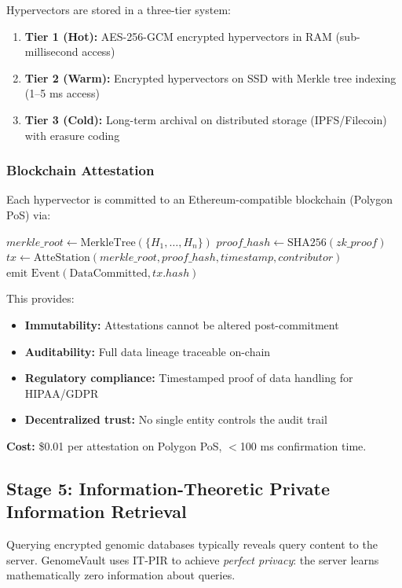 \documentclass[12pt,a4paper]{article}
\begin{document}
Hypervectors are stored in a three-tier system:
\begin{enumerate}
\item \textbf{Tier 1 (Hot):} AES-256-GCM encrypted hypervectors in RAM (sub-millisecond access)
\item \textbf{Tier 2 (Warm):} Encrypted hypervectors on SSD with Merkle tree indexing (1--5 ms access)
\item \textbf{Tier 3 (Cold):} Long-term archival on distributed storage (IPFS/Filecoin) with erasure coding
\end{enumerate}

\subsubsection{Blockchain Attestation}

Each hypervector is committed to an Ethereum-compatible blockchain (Polygon PoS) via:

\begin{algorithmic}
\STATE $merkle\_root \leftarrow \text{MerkleTree}(\{H_1, \ldots, H_n\})$
\STATE $proof\_hash \leftarrow \text{SHA256}(zk\_proof)$
\STATE $tx \leftarrow \text{AtteStation}(merkle\_root, proof\_hash, timestamp, contributor)$
\STATE $\text{emit Event}(\text{DataCommitted}, tx.hash)$
\end{algorithmic}

This provides:
\begin{itemize}
\item \textbf{Immutability:} Attestations cannot be altered post-commitment
\item \textbf{Auditability:} Full data lineage traceable on-chain
\item \textbf{Regulatory compliance:} Timestamped proof of data handling for HIPAA/GDPR
\item \textbf{Decentralized trust:} No single entity controls the audit trail
\end{itemize}

\textbf{Cost:} \$0.01 per attestation on Polygon PoS, $<$100 ms confirmation time.

\subsection{Stage 5: Information-Theoretic Private Information Retrieval}

Querying encrypted genomic databases typically reveals query content to the server. GenomeVault uses IT-PIR to achieve \textit{perfect privacy}: the server learns mathematically zero information about queries.
\end{document}
